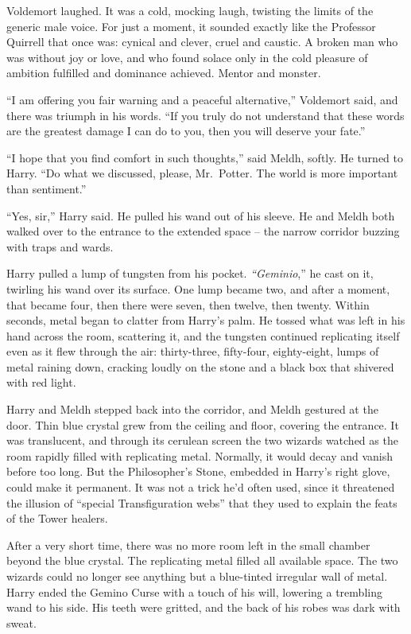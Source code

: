 Voldemort laughed. It was a cold, mocking laugh, twisting the limits of
the generic male voice. For just a moment, it sounded exactly like the
Professor Quirrell that once was: cynical and clever, cruel and caustic.
A broken man who was without joy or love, and who found solace only in
the cold pleasure of ambition fulfilled and dominance achieved. Mentor
and monster.

``I am offering you fair warning and a peaceful alternative,'' Voldemort
said, and there was triumph in his words. ``If you truly do not
understand that these words are the greatest damage I can do to you,
then you will deserve your fate.''

``I hope that you find comfort in such thoughts,'' said Meldh, softly.
He turned to Harry. ``Do what we discussed, please, Mr.~Potter. The
world is more important than sentiment.''

``Yes, sir,'' Harry said. He pulled his wand out of his sleeve. He and
Meldh both walked over to the entrance to the extended space -- the
narrow corridor buzzing with traps and wards.

Harry pulled a lump of tungsten from his pocket. \emph{``Geminio},'' he
cast on it, twirling his wand over its surface. One lump became two, and
after a moment, that became four, then there were seven, then twelve,
then twenty. Within seconds, metal began to clatter from Harry's palm.
He tossed what was left in his hand across the room, scattering it, and
the tungsten continued replicating itself even as it flew through the
air: thirty-three, fifty-four, eighty-eight, lumps of metal raining
down, cracking loudly on the stone and a black box that shivered with
red light.

Harry and Meldh stepped back into the corridor, and Meldh gestured at
the door. Thin blue crystal grew from the ceiling and floor, covering
the entrance. It was translucent, and through its cerulean screen the
two wizards watched as the room rapidly filled with replicating metal.
Normally, it would decay and vanish before too long. But the
Philosopher's Stone, embedded in Harry's right glove, could make it
permanent. It was not a trick he'd often used, since it threatened the
illusion of ``special Transfiguration webs'' that they used to explain
the feats of the Tower healers.

After a very short time, there was no more room left in the small
chamber beyond the blue crystal. The replicating metal filled all
available space. The two wizards could no longer see anything but a
blue-tinted irregular wall of metal. Harry ended the Gemino Curse with a
touch of his will, lowering a trembling wand to his side. His teeth were
gritted, and the back of his robes was dark with sweat.

